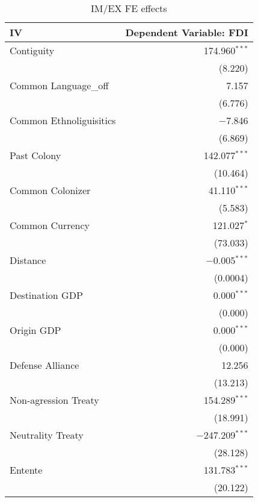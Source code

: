 \documentclass{article}
\begin{document}
\begin{longtable}{lr}
  \caption{IM/EX FE effects}\\
  \hline
  IV&Dependent Variable: FDI\\
  \hline
  \endhead
Contiguity & 174.960$^{***}$ \\ 
  & (8.220) \\ 

Common Language\_off & 7.157 \\ 
  & (6.776) \\ 

Common Ethnoliguisitics & $-$7.846 \\ 
  & (6.869) \\ 

Past Colony & 142.077$^{***}$ \\ 
  & (10.464) \\ 

Common Colonizer & 41.110$^{***}$ \\ 
  & (5.583) \\ 

Common Currency & 121.027$^{*}$ \\ 
  & (73.033) \\ 

Distance & $-$0.005$^{***}$ \\ 
  & (0.0004) \\ 

 Destination GDP & 0.000$^{***}$ \\ 
  & (0.000) \\ 

 Origin GDP & 0.000$^{***}$ \\ 
  & (0.000) \\ 

Defense Alliance & 12.256 \\ 
  & (13.213) \\ 

Non-agression Treaty & 154.289$^{***}$ \\ 
  & (18.991) \\ 

Neutrality Treaty & $-$247.209$^{***}$ \\ 
  & (28.128) \\ 

Entente & 131.783$^{***}$ \\ 
  & (20.122) \\ 


\end{longtable}
\end{document}
